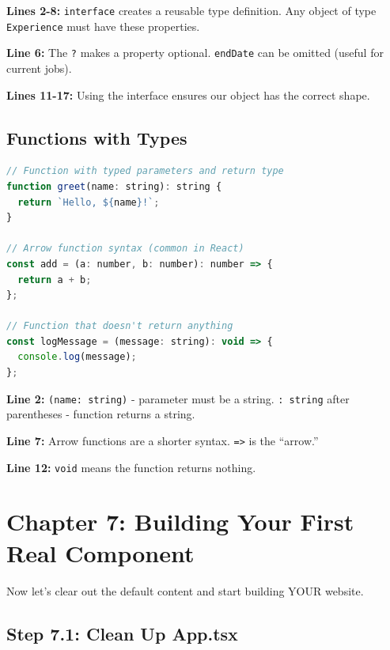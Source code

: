 \documentclass[12pt,a4paper]{article}
\begin{document}
\begin{explanation}
\textbf{Lines 2-8:} \texttt{interface} creates a reusable type definition. Any object of type \texttt{Experience} must have these properties.

\textbf{Line 6:} The \texttt{?} makes a property optional. \texttt{endDate} can be omitted (useful for current jobs).

\textbf{Lines 11-17:} Using the interface ensures our object has the correct shape.
\end{explanation}

\subsection{Functions with Types}

\begin{lstlisting}[language=JavaScript,caption={Typed function parameters and return values}]
// Function with typed parameters and return type
function greet(name: string): string {
  return `Hello, ${name}!`;
}

// Arrow function syntax (common in React)
const add = (a: number, b: number): number => {
  return a + b;
};

// Function that doesn't return anything
const logMessage = (message: string): void => {
  console.log(message);
};
\end{lstlisting}

\begin{explanation}
\textbf{Line 2:} \texttt{(name: string)} - parameter must be a string. \texttt{: string} after parentheses - function returns a string.

\textbf{Line 7:} Arrow functions are a shorter syntax. \texttt{=>} is the ``arrow.''

\textbf{Line 12:} \texttt{void} means the function returns nothing.
\end{explanation}

\section{Chapter 7: Building Your First Real Component}

Now let's clear out the default content and start building YOUR website.

\subsection{Step 7.1: Clean Up App.tsx}
\end{document}
